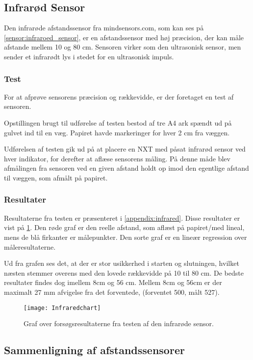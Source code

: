 \subsection{Infrarød Sensor}
Den infrarøde afstandssensor fra mindsensors.com, som kan ses på \cref{sensor:infraroed_sensor}, er en afstandssensor med høj præcision, der kan måle afstande mellem 10 og 80 cm.
Sensoren virker som den ultrasonisk sensor, men sender et infrarødt lys i stedet for en ultrasonisk impuls.

\subsubsection{Test}
For at afprøve sensorens præcision og rækkevidde, er der foretaget en test af sensoren.

Opstillingen brugt til udførelse af testen bestod af tre A4 ark spændt ud på gulvet ind til en væg. 
Papiret havde markeringer for hver 2 cm fra væggen.

Udførelsen af testen gik ud på at placere en NXT med påsat infrarød sensor ved hver indikator, for derefter at aflæse sensorens måling.
På denne måde blev afmålingen fra sensoren ved en given afstand holdt op imod den egentlige afstand til væggen, som afmålt på papiret.

\subsubsection{Resultater}

Resultaterne fra testen er præsenteret i \cref{appendix:infrared}. 
Disse resultater er vist på \cref{sensor:infrared_chart}.
Den røde graf er den reelle afstand, som aflæst på papiret/med lineal, mens de blå firkanter er målepunkter.
Den sorte graf er en lineær regression over måleresultaterne.

Ud fra grafen ses det, at der er stor usikkerhed i starten og slutningen, hvilket næsten stemmer overens med den lovede rækkevidde på 10 til 80 cm.
De bedste resultater findes dog imellem 8cm og 56 cm. 
Mellem 8cm og 56cm er der maximalt 27 mm afvigelse fra det forventede, (forventet 500, målt 527).

\begin{figure}[h]
\texttt{[image: Infraredchart]}
\caption{Graf over forsøgsresultaterne fra testen af den infrarøde sensor.}
\label{sensor:infrared_chart}
\end{figure}

\subsection{Sammenligning af afstandssensorer}

